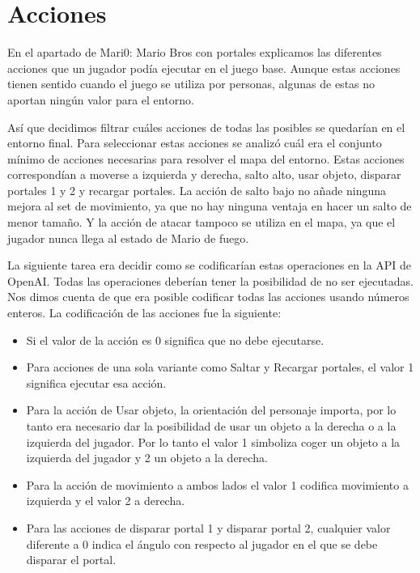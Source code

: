 \section{Acciones}

En el apartado de Mari0: Mario Bros con portales explicamos las diferentes acciones que un jugador podía ejecutar en el juego base. Aunque estas acciones tienen sentido cuando el juego se utiliza por personas, algunas de estas no aportan ningún valor para el entorno. 

Así que decidimos filtrar cuáles acciones de todas las posibles se quedarían en el entorno final. Para seleccionar estas acciones se analizó cuál era el conjunto mínimo de acciones necesarias para resolver el mapa del entorno. Estas acciones correspondían a moverse a izquierda y derecha, salto alto, usar objeto, disparar portales 1 y 2 y recargar portales. La acción de salto bajo no añade ninguna mejora al set de movimiento, ya que no hay ninguna ventaja en hacer un salto de menor tamaño. Y la acción de atacar tampoco se utiliza en el mapa, ya que el jugador nunca llega al estado de Mario de fuego.

La siguiente tarea era decidir como se codificarían estas operaciones en la API de OpenAI. Todas las operaciones deberían tener la posibilidad de no ser ejecutadas. Nos dimos cuenta de que era posible codificar todas las acciones usando números enteros. La codificación de las acciones fue la siguiente:

\begin{itemize}
	\item Si el valor de la acción es 0 significa que no debe ejecutarse.
	\item Para acciones de una sola variante como Saltar y Recargar portales, el valor 1 significa ejecutar esa acción.
 	\item Para la acción de Usar objeto, la orientación del personaje importa, por lo tanto era necesario dar la posibilidad de usar un objeto a la derecha o a la izquierda del jugador. Por lo tanto el valor 1 simboliza coger un objeto a la izquierda del jugador y 2 un objeto a la derecha.
	\item Para la acción de movimiento a ambos lados el valor 1 codifica movimiento a izquierda y el valor 2 a derecha.
	\item Para las acciones de disparar portal 1 y disparar portal 2, cualquier valor diferente a 0 indica el ángulo con respecto al jugador en el que se debe disparar el portal.
\end{itemize}

